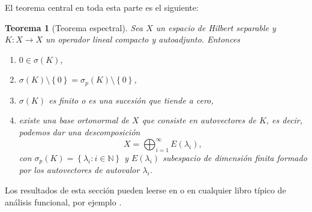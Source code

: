 \documentclass[12pt,a4paper]{article}
\newtheorem{thm}{Teorema}[section]
\theoremstyle{definition} \newtheorem{defn}[thm]{Definición}
\theoremstyle{definition} \newtheorem{ejemplo}[thm]{Ejemplo}
\theoremstyle{definition} \newtheorem{ejercicio}[thm]{Ejercicio}
\theoremstyle{remark} \newtheorem*{obs}{Observación}
\begin{document}
 El teorema central en toda esta parte es el siguiente:
 \begin{thm}[Teorema espectral]
   Sea $X$ un espacio de Hilbert separable y $K:X\rightarrow X$ un operador lineal compacto y autoadjunto. Entonces 
   \begin{enumerate}
     \item $0 \in \sigma(K)$,
     \item $\sigma(K) \setminus \left\{ 0 \right\} = \sigma_p(K) \setminus \left\{ 0 \right\}$,
     \item $\sigma(K)$ es finito o es una sucesión que tiende a cero,
     \item existe una base ortonormal de $X$ que consiste en autovectores de $K$, es decir, podemos dar una descomposición
       \begin{equation*}
	 X=\bigoplus_{i=1}^\infty E(\lambda_i),
       \end{equation*}
       con $\sigma_p(K)=\left\{ \lambda_i: i\in \mathbb{N} \right\}$ y $E(\lambda_i)$ subespacio de dimensión finita formado por los autovectores de autovalor $\lambda_i$.
   \end{enumerate}
 \end{thm}

 Los resultados de esta sección pueden leerse en \cite[Apéndice D]{evans} o en cualquier libro típico de análisis funcional, por ejemplo \cite{limaye}.
\end{document}
